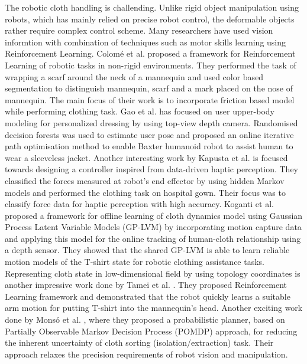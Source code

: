 \documentclass[sigconf]{acmart}
\begin{document}
The robotic cloth handling is challending. Unlike rigid object manipulation using robots, which has mainly relied on precise robot control, the deformable objects rather require complex control scheme. Many researchers have used vision informtion with combination of techniques such as motor skills learning using Reinforcement Learning. Colom{\'e} et al. \cite{colome2015friction} proposed a framework for Reinforcement Learning of robotic tasks in non-rigid environments. They performed the task of wrapping a scarf around the neck of a mannequin and used color based segmentation to distinguish mannequin, scarf and a mark placed on the nose of mannequin. The main focus of their work is to incorporate friction based model while performing clothing task. Gao et al. \cite{gao2015user, gao2016iterative} has focused on user upper-body modeling for personalized dressing by using top-view depth camera. Randomised decision forests was used to estimate user pose and proposed an online iterative path optimisation method to enable Baxter humanoid robot to assist human to wear a sleeveless jacket. Another interesting work by Kapusta et al. \cite{kapusta2016data} is focused towards designing a controller inspired from data-driven haptic perception. They classified the forces measured at robot's end effector by using hidden Markov models and performed the clothing task on hospital gown. Their focus was to classify force data for haptic perception with high accuracy. Koganti et al. \cite{koganti2015cloth} proposed a framework for offline learning of cloth dynamics model using Gaussian Process Latent Variable Models (GP-LVM) by incorporating motion capture data and applying this model for the online tracking of human-cloth relationship using a depth sensor. They showed that the shared GP-LVM is able to learn reliable motion models of the T-shirt state for robotic clothing assistance tasks. Representing cloth state in low-dimensional field by using topology coordinates is another impressive work done by Tamei et al. \cite{tamei2011reinforcement}. They proposed Reinforcement Learning framework and demonstrated that the robot quickly learns a suitable arm motion for putting T-shirt into the mannequin's head. Another exciting work done by Mons{\'o} et al. \cite{monso2012pomdp}, where they proposed a probabilistic planner, based on Partially Observable Markov Decision Process (POMDP) approach, for reducing the inherent uncertainty of cloth sorting (isolation/extraction) task. Their approach relaxes the precision requirements of robot vision and manipulation.
\end{document}
